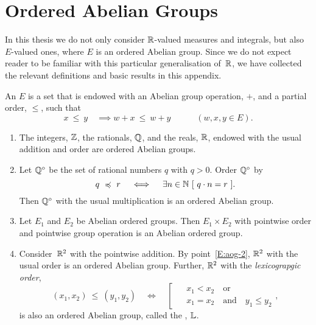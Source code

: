 \documentclass[main.tex]{subfiles}
\begin{document}
\section{Ordered Abelian Groups}
\label{S:ag}
In this thesis
we do not only consider $\mathbb{R}$-valued measures and integrals,
but also~$E$-valued ones, 
where $E$ is an ordered Abelian group.
Since we do not expect reader to be familiar with this
particular generalisation of~$\mathbb{R}$,
we have collected the relevant definitions
and basic results in this appendix.
\begin{dfn}
\label{D:oag}
An  $E$
is a set that is endowed with an Abelian group operation, $+$,
and a partial order, $\leq$, 
such that 
\begin{equation*}
x \ \leq\ y \quad\implies w+x \ \leq\ w+y
\qquad\quad(w,x,y\in E).
\end{equation*}
\end{dfn}
%
%
\begin{exs}
\label{E:oag}
\begin{enumerate}
\item
\label{E:aog-1}
The integers, $\mathbb{Z}$, the rationals, $\mathbb{Q}$, and the reals, $\mathbb{R}$,
endowed with  the usual addition and order
are ordered Abelian groups.

\item
\label{E:oag_div}
Let
$\mathbb{Q}^{\circ}$
be the set of rational numbers $q$ with $q>0$.
Order $\mathbb{Q}^\circ$ by
\begin{equation*}
q \ \preccurlyeq \ r
\quad\iff\quad 
\exists n\in \mathbb{N} \ [\ q \cdot n = r \ ].
\end{equation*}
Then $\mathbb{Q}^\circ$ with 
the usual multiplication is an  ordered Abelian group.

\item
\label{E:aog-2}
Let $E_1$ and $E_2$ be Abelian ordered groups.
Then $E_1\times E_2$ with pointwise order
and pointwise group operation is an Abelian ordered group.

\item
\label{E:oag_lex}
Consider~$\mathbb{R}^2$ with the pointwise addition.
By point~\ref{E:aog-2},
$\mathbb{R}^2$ with the usual order
is an  ordered Abelian group.
Further,
$\mathbb{R}^2$ with the
 \emph{lexicograpgic order},
\begin{equation*}
(x_1,x_2)\ \leq\ (y_1,y_2)
\quad\iff\quad
\left[ \ \ 
\begin{alignedat}{3}
&x_1 < x_2 \quad\text{or}\\
&x_1 = x_2  \quad\text{and}\quad  y_1 \leq y_2 
\end{alignedat}
\right.,
\end{equation*}
is also an ordered Abelian group,
called the ,
 $\mathbb{L}$.
\end{enumerate}
\end{exs}
\end{document}
